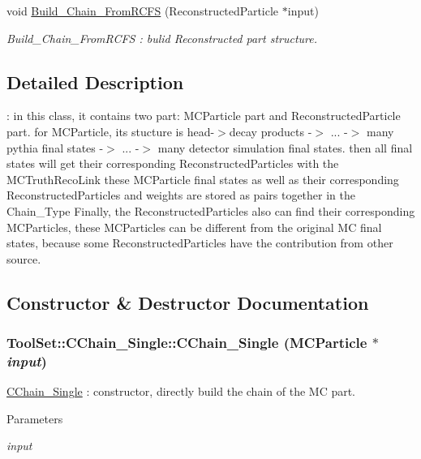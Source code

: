\begin{DoxyCompactItemize}
void \hyperlink{classToolSet_1_1CChain__Single_ac351cca0dcac892111f0110a7be65eac}{Build\_\-Chain\_\-FromRCFS} (ReconstructedParticle $\ast$input)
\begin{DoxyCompactList}\small\item\em Build\_\-Chain\_\-FromRCFS : bulid Reconstructed part structure. \item\end{DoxyCompactList}\end{DoxyCompactItemize}


\subsection{Detailed Description}
: in this class, it contains two part: MCParticle part and ReconstructedParticle part. for MCParticle, its stucture is head-\/$>$decay products -\/$>$ ... -\/$>$ many pythia final states -\/$>$ ... -\/$>$ many detector simulation final states. then all final states will get their corresponding ReconstructedParticles with the MCTruthRecoLink these MCParticle final states as well as their corresponding ReconstructedParticles and weights are stored as pairs together in the Chain\_\-Type Finally, the ReconstructedParticles also can find their corresponding MCParticles, these MCParticles can be different from the original MC final states, because some ReconstructedParticles have the contribution from other source. 

\subsection{Constructor \& Destructor Documentation}
\hypertarget{classToolSet_1_1CChain__Single_a8e1e1a544c3fb42165a90e265205c614}{
\subsubsection[{CChain\_\-Single}]{\setlength{\rightskip}{0pt plus 5cm}ToolSet::CChain\_\-Single::CChain\_\-Single (MCParticle $\ast$ {\em input})}}
\label{classToolSet_1_1CChain__Single_a8e1e1a544c3fb42165a90e265205c614}


\hyperlink{classToolSet_1_1CChain__Single}{CChain\_\-Single} : constructor, directly build the chain of the MC part. 
\begin{DoxyParams}{Parameters}
\item[{\em input}]\end{DoxyParams}


